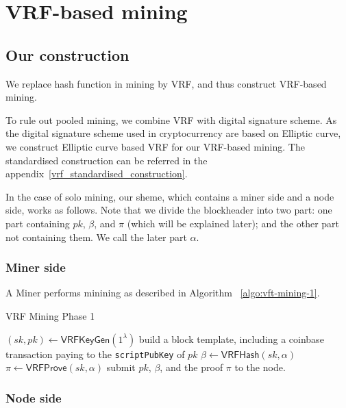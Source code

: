 \section{VRF-based mining}

\subsection{Our construction}

We replace hash function in mining by VRF, and thus construct VRF-based mining.

To rule out pooled mining, we combine VRF with digital signature scheme.
As the digital signature scheme used in cryptocurrency are based on Elliptic curve, we construct Elliptic curve based VRF for our VRF-based mining.
The standardised construction can be referred in the appendix~\ref{vrf_standardised_construction}.


In the case of solo mining, our sheme, which contains a miner side and a node side, works as follows. Note that we divide the blockheader into two part:
one part containing $pk$, $\beta$, and $\pi$ (which will be explained later);
and the other part not containing them.
We call the later part $\alpha$.

\subsubsection{Miner side\\}

A Miner performs minining as described in Algorithm ~\ref{algo:vft-mining-1}.

\begin{algorithm}[H]
\caption{VRF Mining Phase 1}
\label{algo:vft-mining-1}
\SetAlgoLined
  $(sk, pk) \gets \mathsf{VRFKeyGen}(1^{\lambda})$\;
  build a block template, including a coinbase transaction paying to the \texttt{scriptPubKey} of $pk$\;
  $\beta \gets \mathsf{VRFHash}(sk, \alpha)$\;
  $\pi \gets \mathsf{VRFProve}(sk, \alpha)$\;
  submit $pk$, $\beta$, and the proof $\pi$ to the node.
\end{algorithm}

\subsubsection{Node side\\}

